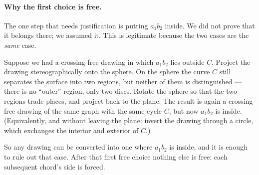 \paragraph{Why the first choice is free.}
The one step that needs justification is putting $a_1b_2$ inside. We did not
prove that it belongs there; we assumed it. This is legitimate because the two
cases are the \emph{same} case.

Suppose we had a crossing-free drawing in which $a_1b_2$ lies outside $C$.
Project the drawing stereographically onto the sphere. On the sphere the curve
$C$ still separates the surface into two regions, but neither of them is
distinguished --- there is no ``outer'' region, only two discs. Rotate the
sphere so that the two regions trade places, and project back to the plane. The
result is again a crossing-free drawing of the same graph with the same cycle
$C$, but now $a_1b_2$ is inside. (Equivalently, and without leaving the plane:
invert the drawing through a circle, which exchanges the interior and exterior
of $C$.)

So any drawing can be converted into one where $a_1b_2$ is inside, and it is
enough to rule out that case. After that first free choice nothing else is
free: each subsequent chord's side is forced.

